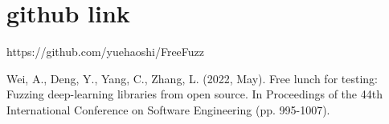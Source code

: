 \documentclass[sigconf]{acmart}
\begin{document}
\section{github link}
https://github.com/yuehaoshi/FreeFuzz
\begin{thebibliography}{9}
 Wei, A., Deng, Y., Yang, C.,  Zhang, L. (2022, May). Free lunch for testing: Fuzzing deep-learning libraries from open source. In Proceedings of the 44th International Conference on Software Engineering (pp. 995-1007).
\end{thebibliography}
\end{document}
